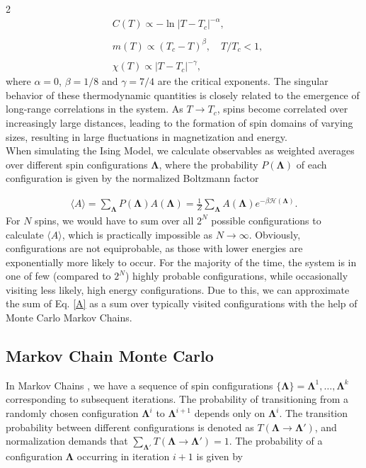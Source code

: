 \documentclass{article}
\begin{document}
\begin{multicols}{2}
\begin{align}
    &C(T) \propto -\ln|T-T_c|^{-\alpha} \label{c}, \\
    \nonumber \\
    &m(T) \propto (T_c-T)^{\beta}, \quad T/T_c < 1 \label{m},\\
    \nonumber \\
    &\chi(T) \propto |T-T_c|^{-\gamma} \label{x},
\end{align}
%
where $\alpha=0$, $\beta=1/8$ and $\gamma=7/4$ are the critical exponents. The singular behavior of these thermodynamic quantities is closely related to the emergence of long-range correlations in the system. As $T\to T_c$, spins become correlated over increasingly large distances, leading to the formation of spin domains of varying sizes, resulting in large fluctuations in magnetization and energy.\\

When simulating the Ising Model, we calculate observables as weighted averages over different spin configurations $\boldsymbol{\Lambda}$, where the probability $P(\boldsymbol{\Lambda})$ of each configuration is given by the normalized Boltzmann factor

\begin{align}
    \langle A\rangle = \sum_{\boldsymbol{\Lambda}}P(\boldsymbol{\Lambda}) A(\boldsymbol{\Lambda}) = 
    \frac{1}{Z}\sum_{\boldsymbol{\Lambda}}A(\boldsymbol{\Lambda})e^{-\beta \mathcal{H}(\boldsymbol{\Lambda})}.
    \label{A}
\end{align}
%
For $N$ spins, we would have to sum over all $2^N$ possible configurations to calculate $\langle A\rangle$, which is practically impossible as $N \to \infty$. Obviously, configurations are not equiprobable, as those with lower energies are exponentially more likely to occur. For the majority of the time, the system is in one of few (compared to $2^N$) highly probable configurations, while occasionally visiting less likely, high energy configurations. Due to this, we can approximate the sum of Eq. \eqref{A} as a sum over typically visited configurations with the help of Monte Carlo Markov Chains.

\subsection{Markov Chain Monte Carlo}

In Markov Chains \cite{montecarlo}, we have a sequence of spin configurations $\{\boldsymbol{\Lambda}\} = \boldsymbol{\Lambda}^1,\dots,\boldsymbol{\Lambda}^k$ corresponding to subsequent iterations. The probability of transitioning from a randomly chosen configuration $\boldsymbol{\Lambda}^i$ to $\boldsymbol{\Lambda}^{i+1}$ depends only on $\boldsymbol{\Lambda}^i$. The transition probability between different configurations is denoted as $T(\boldsymbol{\Lambda}\to \boldsymbol{\Lambda}')$, and normalization demands that $\sum_{\boldsymbol{\Lambda}'}T(\boldsymbol{\Lambda}\to \boldsymbol{\Lambda}') = 1$. The probability of a configuration $\boldsymbol{\Lambda}$ occurring in iteration $i+1$ is given by


\end{multicols}
\end{document}

